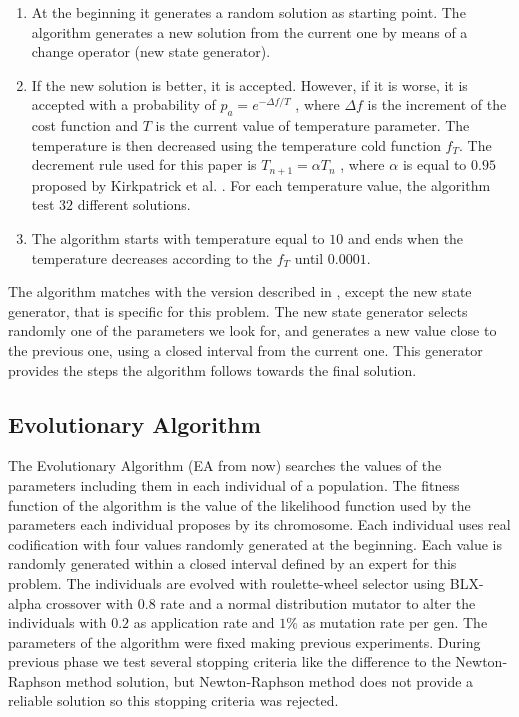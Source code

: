 \documentclass{sig-alternate}
\begin{document}
\begin{enumerate}
\item At the beginning it generates a random solution as starting point. The algorithm generates a new solution from the current one by means of a change operator (new state generator).
\item If the new solution is better, it is accepted. However, if it is worse, it is accepted with a probability of $p_a = e^{ - \Delta f / T }$ , where $\Delta f$  is the increment of the cost function and $T$ is the current value of temperature parameter. The temperature is then decreased using the temperature cold function $f_T$. The decrement rule used for this paper is $T_{n+1} = \alpha T_n$ , where $\alpha$ is equal to $0.95$ proposed by Kirkpatrick et al. \cite{Kirkpatrick83}.  For each temperature value, the algorithm test $32$ different solutions.
\item The algorithm starts with temperature equal to $10$ and ends when the temperature decreases according to the $f_T$ until $0.0001$.
\end{enumerate}

The algorithm matches with the version described in \cite{Michalewicz96}, except the new state generator, that is specific for this problem. The new state generator selects randomly one of the parameters we look for, and generates a new value close to the previous one, using a closed interval from the current one. This generator provides the steps the algorithm follows towards the final solution.


\subsection{Evolutionary Algorithm}
\label{subsec:EA}
The Evolutionary Algorithm (EA from now) \cite{EA} searches the values of the parameters including them in each individual of a population. The fitness function of the algorithm is the value of the likelihood function used by the parameters each individual proposes by its chromosome. Each individual uses real codification with four values randomly generated at the beginning. Each value is randomly generated within a closed interval defined by an expert for this problem. The individuals are evolved with roulette-wheel selector using BLX-alpha crossover \cite{blx} with $0.8$ rate and a normal distribution mutator to alter the individuals with $0.2$ as application rate and $1\%$ as mutation rate per gen. The parameters of the algorithm were fixed making previous experiments. During previous phase we test several stopping criteria like the difference to the Newton-Raphson method solution, but Newton-Raphson method does not provide a reliable solution so this stopping criteria was rejected.
\end{document}
